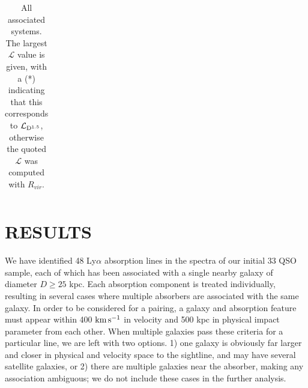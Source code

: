 \documentclass[twocolumn,tighten]{aastex6}
\begin{document}
\begin{table}[ht]
\begin{center}
\begin{tabular}{l l l l l l l l l l l l l l l}
 \\
\hline
\end{tabular}
\end{center}
  \caption{\small{All associated systems. The largest $\mathcal{L}$ value is given, with a (\**) indicating that this corresponds to $\mathcal{L}_{\rm D^{1.5}}$, otherwise the quoted $\mathcal{L}$ was computed with $R_{vir}$.}}
  \label{target_table}
\end{table}



\section{RESULTS}

We have identified 48 Ly$\alpha$ absorption lines in the spectra of our initial 33 QSO sample, each of which has been associated with a single nearby galaxy of diameter $D\geq25$ kpc. Each absorption component is treated individually, resulting in several cases where multiple absorbers are associated with the same galaxy. In order to be considered for a pairing, a galaxy and absorption feature must appear within 400 $\rm km\, s^{-1}$ in velocity and 500 kpc in physical impact parameter from each other. When multiple galaxies pass these criteria for a particular line, we are left with two options. 1) one galaxy is obviously far larger and closer in physical and velocity space to the sightline, and may have several satellite galaxies, or 2) there are multiple galaxies near the absorber, making any association ambiguous; we do not include these cases in the further analysis.
\end{document}
